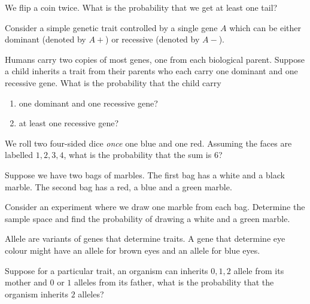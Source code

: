 \documentclass[../main.tex]{subfiles}
\begin{document}
\begin{example}
  We flip a coin twice.  What is the probability that we get at least one tail?
\end{example}

\begin{example}
  Consider a simple genetic trait controlled by a single gene \(A\) which can be either dominant (denoted by \(A+\)) or recessive (denoted by \(A-\)).

  Humans carry two copies of most genes, one from each biological parent. Suppose a child inherits a trait from their parents who each carry one dominant and one recessive gene. What is the probability that the child carry
  \begin{enumerate}
    \item one dominant and one recessive gene?
    \item at least one recessive gene?
  \end{enumerate}

\end{example}
\clearpage

\begin{example}
  We roll two four-sided dice \emph{once} one blue and one red.  Assuming the faces are labelled \(1,2,3,4\), what is the probability that the sum is \(6\)?

\end{example}

\begin{example}
  Suppose we have two bags of marbles.  The first bag has a white and a black marble.  The second bag has a red, a blue and a green marble.

  Consider an experiment where we draw one marble from each bag.  Determine the sample space and find the probability of drawing a white and a green marble. 

\end{example}

\begin{example}
  Allele are variants of genes that determine traits.  A gene that determine eye colour might have an allele for brown eyes and an allele for blue eyes.  

  Suppose for a particular trait, an organism can inherits \(0,1,2\) allele from its mother and \(0\) or \(1\) alleles from its father, what is the probability that the organism inherits \(2\) alleles?

\end{example}
\clearpage
\end{document}
